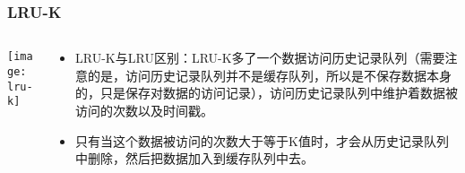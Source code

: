 \begin{frame}[plain]
	\frametitle{LRU-K}
	\begin{columns}
		\begin{column}{.4\textwidth}
			\centering
			\texttt{[image: lru-k]}
		\end{column}
		
		\begin{column}{.6\textwidth}
			
				\begin{itemize}
					
					\item LRU-K与LRU区别：LRU-K多了一个数据访问历史记录队列（需要注意的是，访问历史记录队列并不是缓存队列，所以是不保存数据本身的，只是保存对数据的访问记录），访问历史记录队列中维护着数据被访问的次数以及时间戳。
					\item 只有当这个数据被访问的次数大于等于K值时，才会从历史记录队列中删除，然后把数据加入到缓存队列中去。
					
				\end{itemize}
			
			
		\end{column}
		
		
	\end{columns}
\end{frame}

